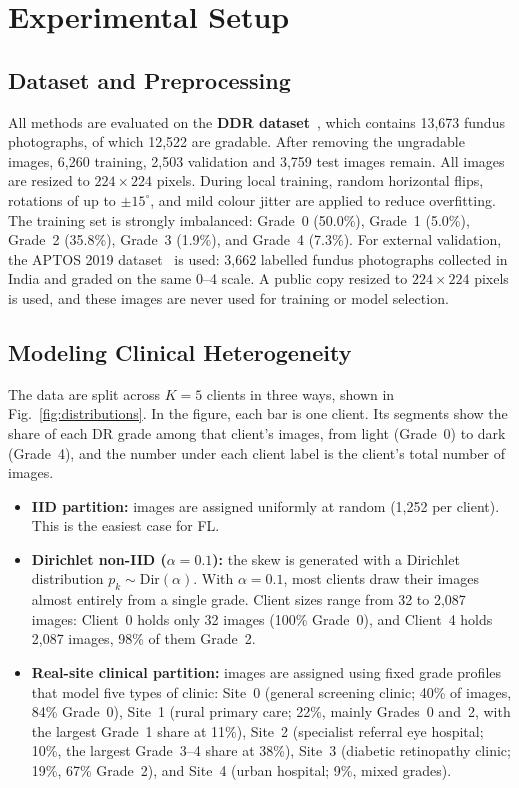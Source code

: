 \section{Experimental Setup}
\label{sec:experiments}

\subsection{Dataset and Preprocessing}

All methods are evaluated on the \textbf{DDR dataset}~\cite{li2019ddr}, which
contains 13,673 fundus photographs, of which 12,522 are gradable. After removing
the ungradable images, 6,260 training, 2,503 validation and 3,759 test images
remain. All images are resized to $224 \times 224$ pixels. During local training,
random horizontal flips, rotations of up to $\pm 15^{\circ}$, and mild colour
jitter are applied to reduce overfitting. The training set is strongly imbalanced:
Grade~0 (50.0\%), Grade~1 (5.0\%), Grade~2 (35.8\%), Grade~3 (1.9\%), and Grade~4
(7.3\%). For external validation, the APTOS 2019 dataset~\cite{aptos2019} is used:
3,662 labelled fundus photographs collected in India and graded on the same 0--4
scale. A public copy resized to $224 \times 224$ pixels is used, and these images
are never used for training or model selection.

\subsection{Modeling Clinical Heterogeneity}

The data are split across $K = 5$ clients in three ways, shown in
Fig.~\ref{fig:distributions}. In the figure, each bar is one client. Its segments
show the share of each DR grade among that client's images, from light (Grade~0)
to dark (Grade~4), and the number under each client label is the client's total
number of images.
\begin{itemize}[leftmargin=*,noitemsep,topsep=2pt]
  \item \textbf{IID partition:} images are assigned uniformly at random (1,252 per
  client). This is the easiest case for FL.
  \item \textbf{Dirichlet non-IID ($\alpha=0.1$):} the skew is generated with a
  Dirichlet distribution $p_k \sim \mathrm{Dir}(\alpha)$. With $\alpha=0.1$, most
  clients draw their images almost entirely from a single grade. Client sizes
  range from 32 to 2,087 images: Client~0 holds only 32 images (100\% Grade~0),
  and Client~4 holds 2,087 images, 98\% of them Grade~2.
  \item \textbf{Real-site clinical partition:} images are assigned using fixed
  grade profiles that model five types of clinic: Site~0 (general screening
  clinic; 40\% of images, 84\% Grade~0), Site~1 (rural primary care; 22\%, mainly
  Grades~0 and~2, with the largest Grade~1 share at 11\%), Site~2 (specialist
  referral eye hospital; 10\%, the largest Grade~3--4 share at 38\%), Site~3
  (diabetic retinopathy clinic; 19\%, 67\% Grade~2), and Site~4 (urban hospital;
  9\%, mixed grades).
\end{itemize}

